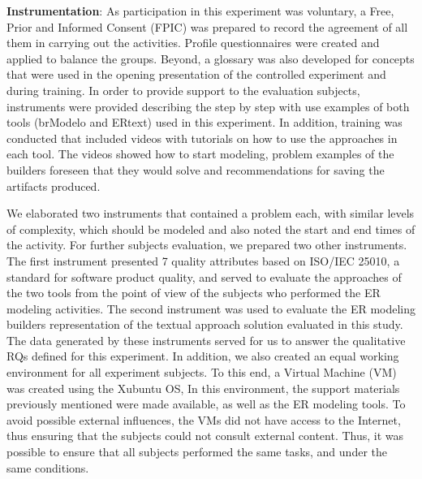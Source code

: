 \documentclass[a4paper,twoside,anonymous]{article}
\begin{document}

\textbf{Instrumentation}: As participation in this experiment was voluntary, a Free, Prior and Informed Consent (FPIC) was prepared %
to record the agreement of all them in carrying out the activities.
Profile questionnaires were created and applied to balance the groups.
Beyond, a glossary was also developed for concepts that were used in the opening presentation of the controlled experiment and during training.
In order to provide support to the evaluation subjects, instruments were provided describing the step by step with use examples of both tools (brModelo and ERtext) used in this experiment.
In addition, training was conducted that included videos with tutorials on how to use the approaches in each tool.
The videos showed how to start modeling, problem examples of the builders foreseen that they would solve and recommendations for saving the artifacts produced.

We elaborated two instruments that contained a problem each, with similar levels of complexity, which should be modeled and also noted the start and end times of the activity.
For further subjects evaluation, we prepared two other instruments.
The first instrument presented 7 quality attributes based on ISO/IEC 25010, %
a standard for software product quality, and served to evaluate the approaches of the two tools from the point of view of the subjects who performed the ER modeling activities.
The second instrument was used to evaluate the ER modeling builders representation of the textual approach solution evaluated in this study.
The data generated by these instruments served for us to answer the qualitative RQs defined for this experiment.
In addition, we also created an equal working environment for all experiment subjects.
To this end, a Virtual Machine (VM) was created using the Xubuntu OS,
In this environment, the support materials previously mentioned were made available, as well as the ER modeling tools.
To avoid possible external influences, the VMs did not have access to the Internet, thus ensuring that the subjects could not consult external content.
Thus, it was possible to ensure that all subjects performed the same tasks, and under the same conditions.
\end{document}
